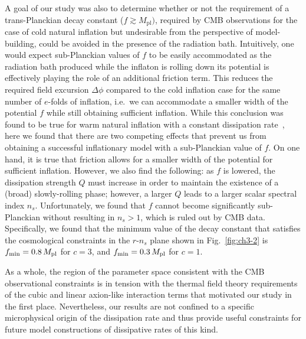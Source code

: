 A goal of our study was also to determine whether or not the requirement of a trans-Planckian decay constant ($f\gtrsim M_{\mathrm{pl}})$, required by CMB observations for the case of cold natural inflation but undesirable from the perspective of model-building, could be avoided in the presence of the radiation bath. Intuitively, one would expect sub-Planckian values of $f$ to be easily accommodated as the radiation bath produced while the inflaton is rolling down its potential is effectively playing the role of an additional friction term. This reduces the required field excursion $\Delta \phi$ compared to the cold inflation case for the same number of $e$-folds of inflation, i.e.\ we can accommodate a smaller width of the potential $f$ while still obtaining sufficient inflation. While this conclusion was found to be true for warm natural inflation with a constant dissipation rate~\cite{Visinelli:2011jy}, here we found that there are two competing effects that prevent us from obtaining a successful inflationary model with a sub-Planckian value of $f$. On one hand, it is true that friction allows for a smaller width of the potential for sufficient inflation. However, we also find the following: as $f$ is lowered, the dissipation strength $Q$ must increase in order to maintain the existence of a (broad) slowly-rolling phase; however, a larger $Q$ leads to a larger scalar spectral index $n_s$. Unfortunately, we found that $f$ cannot become significantly sub-Planckian without resulting in $n_s>1$, which is ruled out by CMB data. Specifically, we found that the minimum value of the decay constant that satisfies the cosmological constraints in the $r$-$n_s$ plane shown in Fig.~\ref{fig:ch3-2} is $f_{\rm min} = 0.8\,M_{\mathrm{pl}}$ for $c=3$, and $f_{\rm min} = 0.3\,M_{\mathrm{pl}}$ for $c=1$.

As a whole, the region of the parameter space consistent with the CMB observational constraints is in tension with the thermal field theory requirements of the cubic and linear axion-like interaction terms that motivated our study in the first place. Nevertheless, our results are not confined to a specific microphysical origin of the dissipation rate and thus provide useful constraints for future model constructions of dissipative rates of this kind.

